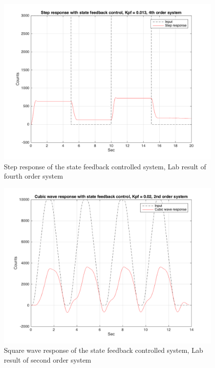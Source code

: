 \documentclass[a4paper, 12pt]{article}
\begin{document}
\begin{figure}[!htbp]
\centering
\includegraphics[scale = 0.3]{LabStepResponseStateFeedback4thOrder}
\caption{Step response of the state feedback controlled system, Lab result of fourth order system}
\label{LabStepResponseStateFeedback4thOrder}
\end{figure}


\begin{figure}[!htbp]
\centering
\includegraphics[scale = 0.3]{LabCubicResponseStateFeedback}
\caption{Square wave response of the state feedback controlled system, Lab result of second order system}
\label{LabCubicResponseStateFeedback}
\end{figure}
\end{document}
